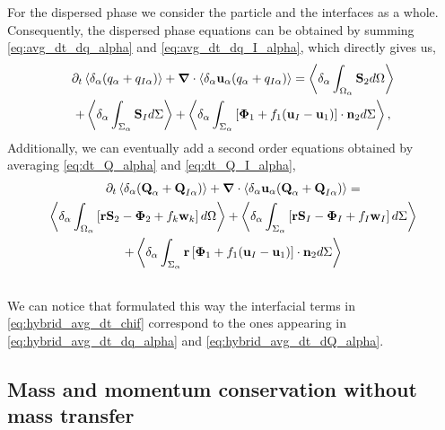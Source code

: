 For the dispersed phase we consider the particle and the interfaces as a whole.
Consequently, the dispersed phase equations can be obtained by summing \ref{eq:avg_dt_dq_alpha} and \ref{eq:avg_dt_dq_I_alpha}, which directly gives us, 
\begin{multline}
    \partial_t \left<\delta_\alpha  (q_\alpha+q_{I\alpha})\right>
    + \bm{\nabla} \cdot\left<\delta_\alpha \textbf{u}_\alpha (q_\alpha+q_{I\alpha}) \right>
    = \left<\delta_\alpha \int_{\Omega_\alpha} \textbf{S}_2 d\Omega\right>\\
    + \left<\delta_\alpha \int_{\Sigma_\alpha} \textbf{S}_I d\Sigma\right>
    + \left<\delta_\alpha \int_{\Sigma_\alpha} \left[\bm{\Phi}_1 + f_1 (\textbf{u}_I-\textbf{u}_1) \right] \cdot \textbf{n}_2 d\Sigma\right>,
    \label{eq:hybrid_avg_dt_dq_alpha}\\
\end{multline}
Additionally, we can eventually add a second order equations obtained by averaging \ref{eq:dt_Q_alpha} and \ref{eq:dt_Q_I_alpha},
\begin{multline}
    \partial_t \left<\delta_\alpha (\textbf{Q}_\alpha+\textbf{Q}_{I\alpha})\right>
    + \bm{\nabla}\cdot \left<\delta_\alpha   \textbf{u}_\alpha (\textbf{Q}_\alpha+\textbf{Q}_{I\alpha})\right>
    =\\ \left<\delta_\alpha \int_{\Omega_\alpha} \left[
        \textbf{r}\textbf{S}_2
        - \mathbf{\Phi}_2
        + f_k\textbf{w}_k
        \right] d\Omega\right>
    + \left<\delta_\alpha \int_{\Sigma_\alpha} \left[
        \textbf{r}\textbf{S}_I
        - \mathbf{\Phi}_I
        + f_I\textbf{w}_I
    \right] d\Sigma\right>\\
    + \left<\delta_\alpha \int_{\Sigma_\alpha} \textbf{r}\left[\bm{\Phi}_1 + f_1 (\textbf{u}_I-\textbf{u}_1) \right] \cdot \textbf{n}_2 d\Sigma\right>\\
    \label{eq:hybrid_avg_dt_dQ_alpha}\\
\end{multline}
We can notice that formulated this way the interfacial terms in \ref{eq:hybrid_avg_dt_chif} correspond to the ones appearing in \ref{eq:hybrid_avg_dt_dq_alpha} and \ref{eq:hybrid_avg_dt_dQ_alpha}.

\subsection{Mass and momentum conservation without mass transfer}

